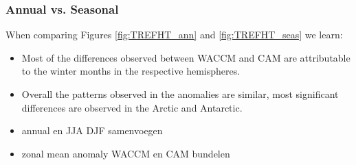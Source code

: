 \subsubsection{Annual vs. Seasonal}
When comparing Figures \ref{fig:TREFHT_ann} and \ref{fig:TREFHT_seas} we learn:

\begin{itemize}
	\item Most of the differences observed between WACCM and CAM are attributable to the winter months in the respective hemispheres. 
	\item Overall the patterns observed in the anomalies are similar, most significant differences are observed in the Arctic and Antarctic. 
	\item annual en JJA DJF samenvoegen
	\item zonal mean anomaly WACCM en CAM bundelen
\end{itemize}